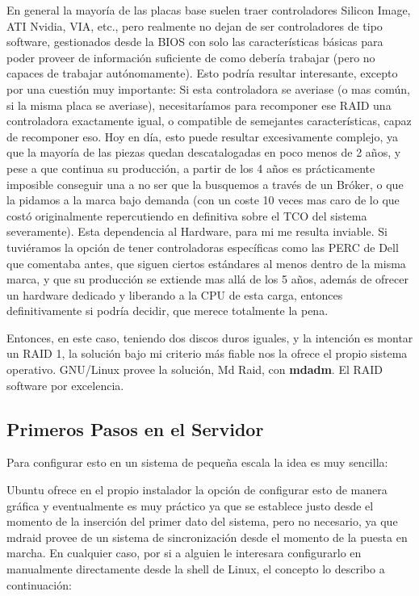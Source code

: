 En general la mayoría de las placas base suelen traer controladores Silicon Image, ATI Nvidia, VIA, etc., pero realmente no dejan de ser controladores de tipo software, gestionados desde la BIOS con solo las características básicas para poder proveer de información suficiente de como debería trabajar (pero no capaces de trabajar autónomamente). Esto podría resultar interesante, excepto por una cuestión muy importante: Si esta controladora se averiase (o mas común, si la misma placa se averiase), necesitaríamos para recomponer ese RAID una controladora exactamente igual, o compatible de semejantes características, capaz de recomponer eso. Hoy en día, esto puede resultar excesivamente complejo, ya que la mayoría de las piezas quedan descatalogadas en poco menos de 2 años, y pese a que continua su producción, a partir de los 4 años es prácticamente imposible conseguir una a no ser que la busquemos a través de un Bróker, o que la pidamos a la marca bajo demanda (con un coste 10 veces mas caro de lo que costó originalmente repercutiendo en definitiva sobre el TCO del sistema severamente). Esta dependencia al Hardware, para mi me resulta inviable. Si tuviéramos la opción de tener controladoras específicas como las PERC de Dell que comentaba antes, que siguen ciertos estándares al menos dentro de la misma marca, y que su producción se extiende mas allá de los 5 años, además de ofrecer un hardware dedicado y liberando a la CPU de esta carga, entonces definitivamente si podría decidir, que merece totalmente la pena.

Entonces, en este caso, teniendo dos discos duros iguales, y la intención es montar un RAID 1, la solución bajo mi criterio más fiable nos la ofrece el propio sistema operativo. GNU/Linux provee la solución, Md Raid, con \textbf{mdadm}. El RAID software por excelencia.

\subsection{Primeros Pasos en el Servidor}

Para configurar esto en un sistema de pequeña escala la idea es muy sencilla:

Ubuntu ofrece en el propio instalador la opción de configurar esto de manera gráfica y eventualmente es muy práctico ya que se establece justo desde el momento de la inserción del primer dato del sistema, pero no necesario, ya que mdraid provee de un sistema de sincronización desde el momento de la puesta en marcha. En cualquier caso, por si a alguien le interesara configurarlo en manualmente directamente desde la shell de Linux, el concepto lo describo a continuación:


